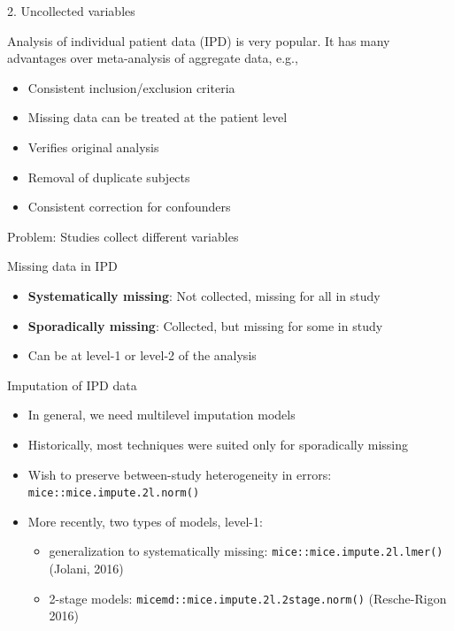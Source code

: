\documentclass[ignorenonframetext,aspectratio=43]{beamer}
\providecommand{\tightlist}{%
  \setlength{\itemsep}{0pt}\setlength{\parskip}{0pt}}
\begin{document}
\begin{frame}{2. Uncollected variables}
\protect\hypertarget{uncollected-variables}{}

Analysis of individual patient data (IPD) is very popular. It has many
advantages over meta-analysis of aggregate data, e.g.,

\begin{itemize}
\tightlist
\item
  Consistent inclusion/exclusion criteria
\item
  Missing data can be treated at the patient level
\item
  Verifies original analysis
\item
  Removal of duplicate subjects
\item
  Consistent correction for confounders
\end{itemize}

\end{frame}

\begin{frame}{Problem: Studies collect different variables}
\protect\hypertarget{problem-studies-collect-different-variables}{}

Missing data in IPD

\begin{itemize}
\item
  \textbf{Systematically missing}: Not collected, missing for all in
  study
\item
  \textbf{Sporadically missing}: Collected, but missing for some in
  study
\item
  Can be at level-1 or level-2 of the analysis
\end{itemize}

\end{frame}

\begin{frame}[fragile]{Imputation of IPD data}
\protect\hypertarget{imputation-of-ipd-data}{}

\begin{itemize}
\tightlist
\item
  In general, we need multilevel imputation models
\item
  Historically, most techniques were suited only for sporadically
  missing
\item
  Wish to preserve between-study heterogeneity in errors:
  \texttt{mice::mice.impute.2l.norm()}
\item
  More recently, two types of models, level-1:

  \begin{itemize}
  \tightlist
  \item
    generalization to systematically missing:
    \texttt{mice::mice.impute.2l.lmer()} (Jolani, 2016)
  \item
    2-stage models: \texttt{micemd::mice.impute.2l.2stage.norm()}
    (Resche-Rigon 2016)
  \end{itemize}
\end{itemize}

\end{frame}
\end{document}
